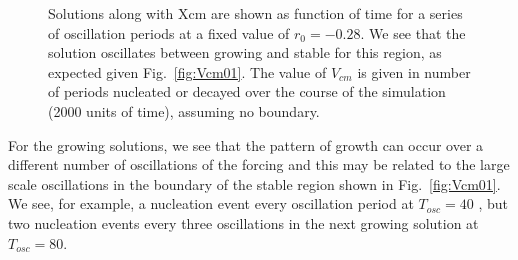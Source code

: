 \documentclass[pre,preprint,superscriptaddress]{revtex4-1}
\begin{document}
\begin{figure}[!htb]
\begin{center}
{      }
    \caption{Solutions along with Xcm are shown as  function of time for a series of oscillation periods at a fixed value of $r_0=-0.28$.  We see that the solution oscillates between growing and stable for this region, as expected given Fig.~\ref{fig:Vcm01}.  The value of $V_{cm}$ is given in number of periods nucleated or decayed over the course of the simulation (2000 units of time), assuming no boundary.}
    \label{fig:r28slice2}
  \end{center}
\end{figure} 
For the growing solutions, we see that the pattern of growth can occur over a different number of oscillations of the forcing and this may be related to the large scale oscillations in the boundary of the stable region shown in Fig.~\ref{fig:Vcm01}.  We see, for example, a nucleation event every oscillation period at $T_{osc}=40$ , but two nucleation events every three oscillations in the next growing solution at $T_{osc}=80$.
\end{document}
